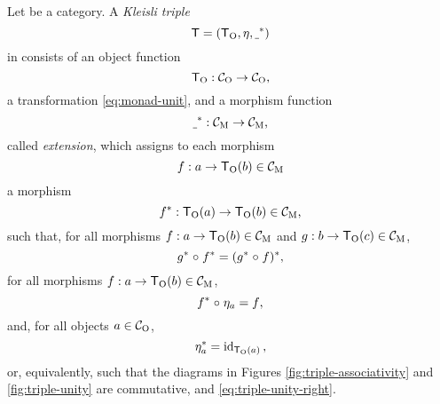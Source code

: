 \begin{definition}
  \label{def:triple}


  Let  be a category. A \emph{Kleisli triple}
  \begin{equation}
    \label{eq:triple}
    \mon{T} = (\funcO{T}, \nat{\eta}, \monM{T}{\underscore})
  \end{equation}
  in  consists of an object function
  \begin{equation}
    \label{eq:triple-}
    \funcO{T}: \catO{C} \to \catO{C}
    \text{,}
  \end{equation}
  a transformation \nat{\eta} \eqref{eq:monad-unit}, and a morphism
  function
  \begin{equation}
    \label{eq:triple-extension}
    \monM{T}{\underscore}: \catM{C} \to \catM{C}
    \text{,}
  \end{equation}
  called \emph{extension}, which assigns to each morphism
  \begin{equation*}
    f: a \to \funcO{T}(b) \in \catM{C}
  \end{equation*}
  a morphism
  \begin{equation*}
    \monM{T}{f}: \funcO{T}(a) \to \funcO{T}(b) \in \catM{C}
    \text{,}
  \end{equation*}
  such that, for all morphisms $f: a \to \funcO{T}(b) \in \catM{C}$
  and $g: b \to \funcO{T}(c) \in \catM{C}$,
  \begin{equation}
    \label{eq:triple-associativity}
    \monM{T}{g} \comp \monM{T}{f} = \monM{T}{(\monM{T}{g} \comp f)}
    \text{,}
  \end{equation}
  for all morphisms $f: a \to \funcO{T}(b) \in \catM{C}$,
  \begin{equation}
    \label{eq:triple-unity-left}
    \monM{T}{f} \comp \natO{\eta}{a} = f
    \text{,}
  \end{equation}
  and, for all objects $a \in \catO{C}$,
  \begin{equation}
    \label{eq:triple-unity-right}
    \monM{T}{\natO{\eta}{a}} = \idO{\funcO{T}(a)}
    \text{,}
  \end{equation}
  or, equivalently, such that the diagrams in Figures
  \ref{fig:triple-associativity} and \ref{fig:triple-unity} are
  commutative, and \eqref{eq:triple-unity-right}.
  \begin{figure}[htb]
    \begin{subfigure}[b]{0.5\linewidth}
      \begin{center}
\end{center}
\end{subfigure}
\end{figure}
\end{definition}
